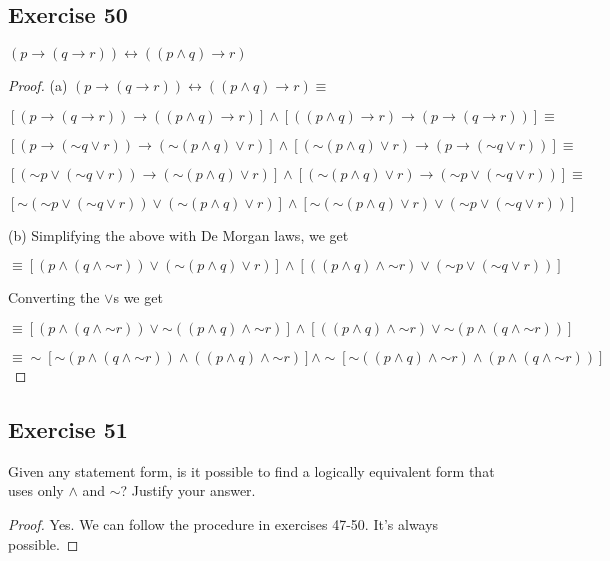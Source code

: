 \documentclass[14pt]{extarticle}
\newcommand{\bic}{\leftrightarrow}
\begin{document}
\subsection{Exercise 50}
$(p \to (q \to r)) \bic ((p \wedge q) \to r)$

\begin{proof}
    (a) $(p \to (q \to r)) \bic ((p \wedge q) \to r) \equiv $

    $[(p \to (q \to r)) \to ((p \wedge q) \to r)] \wedge [((p \wedge q) \to r) \to (p \to (q \to r))] \equiv$

    $[(p \to ({\sim q} \vee r)) \to ({\sim (p \wedge q)} \vee r)] \wedge [({\sim (p \wedge q)} \vee r) \to (p \to ({\sim q} \vee r))] \equiv$

    $[({\sim p} \vee ({\sim q} \vee r)) \to ({\sim (p \wedge q)} \vee r)] \wedge [({\sim (p \wedge q)} \vee r) \to ({\sim p} \vee ({\sim q} \vee r))] \equiv$

    $[{\sim ({\sim p} \vee ({\sim q} \vee r))} \vee ({\sim (p \wedge q)} \vee r)] \wedge [{\sim ({\sim (p \wedge q)} \vee r)} \vee ({\sim p} \vee ({\sim q} \vee r))]$

    (b) Simplifying the above with De Morgan laws, we get

    $\equiv [(p \wedge (q \wedge {\sim r})) \vee ({\sim (p \wedge q)} \vee r)] \wedge [((p \wedge q) \wedge {\sim r}) \vee ({\sim p} \vee ({\sim q} \vee r))]$

    Converting the $\vee$s we get

    $\equiv [(p \wedge (q \wedge {\sim r})) \vee {\sim((p \wedge q) \wedge {\sim r})}] \wedge [((p \wedge q) \wedge {\sim r}) \vee {\sim(p \wedge (q \wedge {\sim r}))}]$

    $\equiv \sim[{\sim (p \wedge (q \wedge {\sim r}))} \wedge ((p \wedge q) \wedge {\sim r})] \wedge \sim[{\sim ((p \wedge q) \wedge {\sim r})} \wedge (p \wedge (q \wedge {\sim r}))]$
\end{proof}

\subsection{Exercise 51}
Given any statement form, is it possible to find a logically equivalent form that uses only $\wedge$ and $\sim$? Justify your answer.

\begin{proof}
    Yes. We can follow the procedure in exercises 47-50. It's always possible.
\end{proof}
\end{document}
